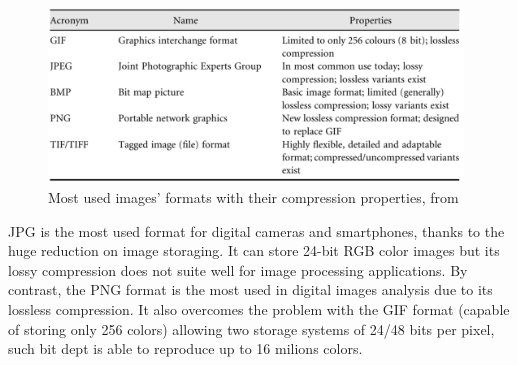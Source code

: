 \documentclass[../main.tex]{subfiles}
\begin{document}
\begin{figure}[H] 
\begin{center}
\includegraphics[width=11cm]{images/image_formats.png}
\caption{\small{Most used images' formats with their compression properties, from \cite{digital_processing_matlab}}}\label{fig:table_formats}
\end{center}
\end{figure}
JPG is the most used format for digital cameras and smartphones, thanks to the huge reduction on image storaging. It can store 24-bit RGB color images but its lossy compression does not suite well for image processing applications. By contrast, the PNG format is the most used in digital images analysis due to its lossless compression. It  also overcomes the problem with the GIF format (capable of storing only 256 colors) allowing two storage systems of 24/48 bits per pixel\cite{roelofs1999png}, such bit dept is able to reproduce up to 16 milions colors.

 
\end{document}
